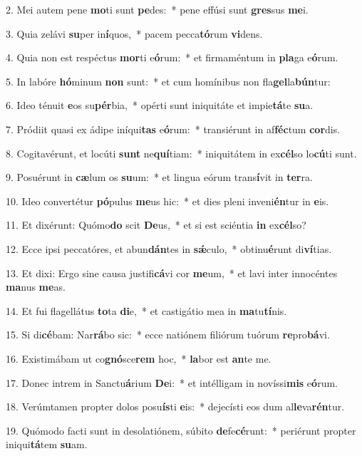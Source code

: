 2. Mei autem pene \textbf{mo}ti sunt \textbf{pe}des:~*  pene effúsi sunt \textbf{gres}sus \textbf{me}i.\

3. Quia zelávi \textbf{su}per in\textbf{í}quos,~*  pacem pecca\textbf{tó}rum \textbf{vi}dens.\

4. Quia non est respéctus \textbf{mor}ti e\textbf{ó}rum:~*  et firmaméntum in \textbf{pla}ga e\textbf{ó}rum.\

5. In labóre \textbf{hó}minum \textbf{non} sunt:~*  et cum homínibus non fla\textbf{gel}la\textbf{bún}tur:\

6. Ideo ténuit \textbf{e}os su\textbf{pér}bia,~*  opérti sunt iniquitáte et impie\textbf{tá}te \textbf{su}a.\

7. Pródiit quasi ex ádipe iníqui\textbf{tas} e\textbf{ó}rum:~*  transiérunt in af\textbf{féc}tum \textbf{cor}dis.\

8. Cogitavérunt, et locúti \textbf{sunt} ne\textbf{quí}tiam:~*  iniquitátem in ex\textbf{cél}so lo\textbf{cú}ti sunt.\

9. Posuérunt in \textbf{cæ}lum os \textbf{su}um:~*  et lingua eórum trans\textbf{í}vit in \textbf{ter}ra.\

10. Ideo convertétur \textbf{pó}pulus \textbf{me}us hic:~*  et dies pleni inveni\textbf{én}tur in \textbf{e}is.\

11. Et dixérunt: Quómo\textbf{do} scit \textbf{De}us,~*  et si est sciéntia \textbf{in} ex\textbf{cél}so?\

12. Ecce ipsi peccatóres, et abun\textbf{dán}tes in \textbf{sǽ}culo,~*  obtinu\textbf{é}runt di\textbf{ví}tias.\

13. Et dixi: Ergo sine causa justifi\textbf{cá}vi cor \textbf{me}um,~*  et lavi inter innocéntes \textbf{ma}nus \textbf{me}as.\

14. Et fui flagellátus \textbf{to}ta \textbf{di}e,~*  et castigátio mea in \textbf{ma}tu\textbf{tí}nis.\

15. Si di\textbf{cé}bam: Nar\textbf{rá}bo sic:~*  ecce natiónem filiórum tuórum \textbf{re}pro\textbf{bá}vi.\

16. Existimábam ut co\textbf{gnó}sce\textbf{rem} hoc,~*  \textbf{la}bor est \textbf{an}te me.\

17. Donec intrem in Sanctu\textbf{á}rium \textbf{De}i:~*  et intélligam in novíssi\textbf{mis} e\textbf{ó}rum.\

18. Verúmtamen propter dolos posu\textbf{ís}ti \textbf{e}is:~*  dejecísti eos dum al\textbf{le}va\textbf{rén}tur.\

19. Quómodo facti sunt in desolatiónem, súbito \textbf{de}fe\textbf{cé}runt:~*  periérunt propter iniqui\textbf{tá}tem \textbf{su}am.\

